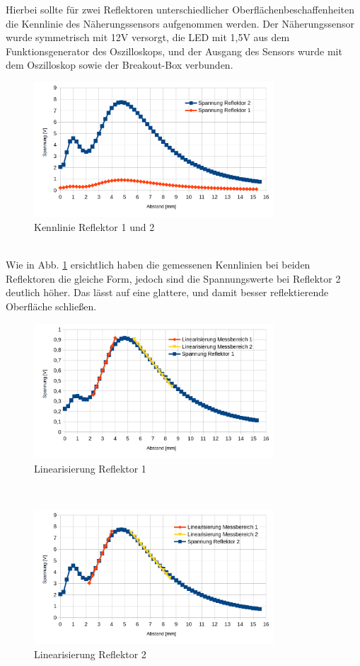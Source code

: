 Hierbei sollte für zwei Reflektoren unterschiedlicher Oberflächenbeschaffenheiten die Kennlinie des Näherungssensors aufgenommen werden. Der Näherungssensor wurde symmetrisch mit 12V versorgt, die LED mit 1,5V aus dem Funktionsgenerator des Oszilloskops, und der Ausgang des Sensors wurde mit dem Oszilloskop sowie der Breakout-Box verbunden.
\begin{figure}[h]
	\centering
	\includegraphics[width=0.8\textwidth]{./img/Kennlinie_Reflektor_1_und_2}
	\caption{Kennlinie Reflektor 1 und 2}
	\label{fg:kenn_refl}
\end{figure}
~\\
Wie in Abb. \ref{fg:kenn_refl} ersichtlich haben die gemessenen Kennlinien bei beiden Reflektoren die gleiche Form, jedoch sind die Spannungswerte bei Reflektor 2 deutlich höher. Das lässt auf eine glattere, und damit besser reflektierende Oberfläche schließen.
\begin{figure}[h]
	\centering
	\includegraphics[width=0.8\textwidth]{./img/Linearisierung_Reflektor_1}
	\caption{Linearisierung Reflektor 1}
	\label{fg:kenn_linear1}
\end{figure}
~\\\begin{figure}[h]
	\centering
	\includegraphics[width=0.8\textwidth]{./img/Linearisierung_Reflektor_2}
	\caption{Linearisierung Reflektor 2}
	\label{fg:kenn_linear2}
\end{figure}
